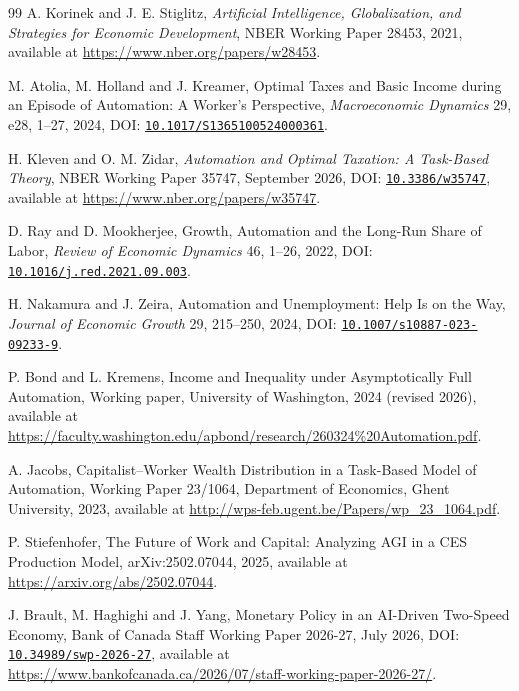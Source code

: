 \documentclass[review,12pt]{elsarticle}
\theoremstyle{plain}
\theoremstyle{definition}
\theoremstyle{remark}
\begin{document}
\begin{thebibliography}{99}
 A. Korinek and J. E. Stiglitz, \emph{Artificial Intelligence, Globalization, and Strategies for Economic Development}, NBER Working Paper 28453, 2021, available at \url{https://www.nber.org/papers/w28453}.

 M. Atolia, M. Holland and J. Kreamer, Optimal Taxes and Basic Income during an Episode of Automation: A Worker's Perspective, \emph{Macroeconomic Dynamics} 29, e28, 1--27, 2024, DOI: \href{https://doi.org/10.1017/S1365100524000361}{\texttt{10.1017/S1365100524000361}}.

 H. Kleven and O. M. Zidar, \emph{Automation and Optimal Taxation: A Task-Based Theory}, NBER Working Paper 35747, September 2026, DOI: \href{https://doi.org/10.3386/w35747}{\texttt{10.3386/w35747}}, available at \url{https://www.nber.org/papers/w35747}.

 D. Ray and D. Mookherjee, Growth, Automation and the Long-Run Share of Labor, \emph{Review of Economic Dynamics} 46, 1--26, 2022, DOI: \href{https://doi.org/10.1016/j.red.2021.09.003}{\texttt{10.1016/j.red.2021.09.003}}.

 H. Nakamura and J. Zeira, Automation and Unemployment: Help Is on the Way, \emph{Journal of Economic Growth} 29, 215--250, 2024, DOI: \href{https://doi.org/10.1007/s10887-023-09233-9}{\texttt{10.1007/s10887-023-09233-9}}.

 P. Bond and L. Kremens, Income and Inequality under Asymptotically Full Automation, Working paper, University of Washington, 2024 (revised 2026), available at \url{https://faculty.washington.edu/apbond/research/260324%20Automation.pdf}.

 A. Jacobs, Capitalist--Worker Wealth Distribution in a Task-Based Model of Automation, Working Paper 23/1064, Department of Economics, Ghent University, 2023, available at \url{http://wps-feb.ugent.be/Papers/wp_23_1064.pdf}.

 P. Stiefenhofer, The Future of Work and Capital: Analyzing AGI in a CES Production Model, arXiv:2502.07044, 2025, available at \url{https://arxiv.org/abs/2502.07044}.

 J. Brault, M. Haghighi and J. Yang, Monetary Policy in an AI-Driven Two-Speed Economy, Bank of Canada Staff Working Paper 2026-27, July 2026, DOI: \href{https://doi.org/10.34989/swp-2026-27}{\texttt{10.34989/swp-2026-27}}, available at \url{https://www.bankofcanada.ca/2026/07/staff-working-paper-2026-27/}.

\end{thebibliography}
\end{document}
